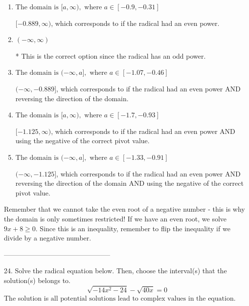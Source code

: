 \documentclass{article}[14pt]
\begin{document}
\begin{enumerate}[label=\Alph*.] 
\item $ \text{The domain is } [a, \infty), \text{   where } a \in [-0.9, -0.31] $ 

 $[-0.889, \infty)$, which corresponds to if the radical had an even power. 
\item $ (-\infty, \infty) $ 

 * This is the correct option since the radical has an odd power. 
\item $ \text{The domain is } (-\infty, a], \text{   where } a \in [-1.07, -0.46] $ 

 $(-\infty, -0.889]$, which corresponds to if the radical had an even power AND reversing the direction of the domain. 
\item $ \text{The domain is } [a, \infty), \text{   where } a \in [-1.7, -0.93] $ 

 $[-1.125, \infty)$, which corresponds to if the radical had an even power AND using the negative of the correct pivot value. 
\item $ \text{The domain is } (-\infty, a], \text{   where } a \in [-1.33, -0.91] $ 

 $(-\infty, -1.125]$, which corresponds to if the radical had an even power AND reversing the direction of the domain AND using the negative of the correct pivot value. 
\end{enumerate} 
 
Remember that we cannot take the even root of a negative number - this is why the domain is only sometimes restricted! If we have an even root, we solve $9 x + 8 \geq 0$. Since this is an inequality, remember to flip the inequality if we divide by a negative number.

-----------------------------------------------

24. Solve the radical equation below. Then, choose the interval(s) that the solution(s) belongs to.
$$ \sqrt{-14 x^2 - 24} - \sqrt{40 x} = 0 $$ 
The solution is $ \text{all potential solutions lead to complex values in the equation.} $ 
\end{document}
